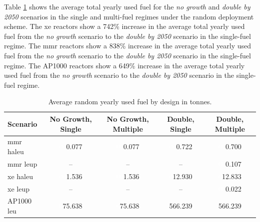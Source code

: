 Table \ref{tab:random_used_avg} shows the average total yearly used fuel for the \textit{no growth} and \textit{double by 2050} scenarios in the single and multi-fuel regimes under the random deployment scheme. The \gls{xe} reactors show a 742\% increase in the average total yearly used fuel from the \textit{no growth} scenario to the \textit{double by 2050} scenario in the single-fuel regime. The \gls{mmr} reactors show a 838\% increase in the average total yearly used fuel from the \textit{no growth} scenario to the \textit{double by 2050} scenario in the single-fuel regime. The AP1000 reactors show a 649\% increase in the average total yearly used fuel from the \textit{no growth} scenario to the \textit{double by 2050} scenario in the single-fuel regime.

\begin{table}[H]
    \centering
    \caption{Average random yearly used fuel by design in tonnes.}
    \label{tab:random_used_avg}
    \begin{tabular}{l c c c c}
       \hline
       Scenario & No Growth, Single & No Growth, Multiple & Double, Single & Double, Multiple  \\
       \hline
       \gls{mmr} \gls{haleu}   & \textcolor{white}{00}0.077    & \textcolor{white}{00}0.077   & \textcolor{white}{00}0.722    & \textcolor{white}{00}0.700    \\
       \gls{mmr} \gls{leup}    & --       & --      & --       & \textcolor{white}{00}0.107    \\
       \gls{xe} \gls{haleu}    & \textcolor{white}{00}1.536    & \textcolor{white}{00}1.536   & \textcolor{white}{0}12.930   & \textcolor{white}{0}12.833   \\
       \gls{xe} \gls{leup}     & --       & --      & --       & \textcolor{white}{00}0.022    \\
       AP1000 \gls{leu}        & \textcolor{white}{0}75.638   & \textcolor{white}{0}75.638  & 566.239  & 566.239  \\
       \hline
    \end{tabular}
\end{table}

